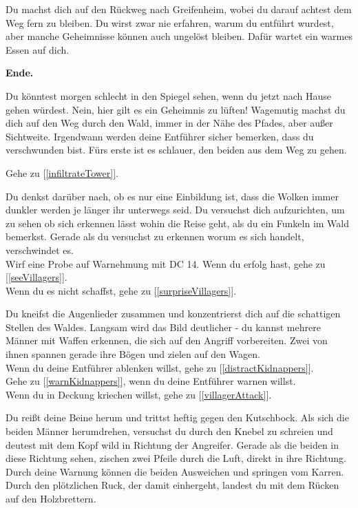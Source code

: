 
Du machst dich auf den Rückweg nach Greifenheim, wobei du darauf achtest dem Weg fern zu bleiben.
Du wirst zwar nie erfahren, warum du entführt wurdest, aber manche Geheimnisse können auch ungelöst bleiben. Dafür wartet ein warmes Essen auf dich.

\textbf{Ende.}


Du könntest morgen schlecht in den Spiegel sehen, wenn du jetzt nach Hause gehen würdest. Nein, hier gilt es ein Geheimnis zu lüften! Wagemutig machst du dich auf den Weg durch den Wald, immer in der Nähe des Pfades, aber außer Sichtweite. Irgendwann werden deine Entführer sicher bemerken, dass du verschwunden bist. Fürs erste ist es schlauer, den beiden aus dem Weg zu gehen.

Gehe zu [\ref{infiltrateTower}].


Du denkst darüber nach, ob es nur eine Einbildung ist, dass die Wolken immer dunkler werden je länger ihr unterwegs seid. Du versuchst dich aufzurichten, um zu sehen ob sich erkennen lässt wohin die Reise geht, als du ein Funkeln im Wald bemerkst. Gerade als du versuchst zu erkennen worum es sich handelt, verschwindet es.
\\Wirf eine Probe auf Warnehmung mit DC 14. Wenn du erfolg hast, gehe zu [\ref{seeVillagers}].
\\Wenn du es nicht schaffst, gehe zu [\ref{surpriseVillagers}].


Du kneifst die Augenlieder zusammen und konzentrierst dich auf die schattigen Stellen des Waldes. Langsam wird das Bild deutlicher - du kannst mehrere Männer mit Waffen erkennen, die sich auf den Angriff vorbereiten. Zwei von ihnen spannen gerade ihre Bögen und zielen auf den Wagen.
\\Wenn du deine Entführer ablenken willst, gehe zu [\ref{distractKidnappers}].
\\Gehe zu [\ref{warnKidnappers}], wenn du deine Entführer warnen willst.
\\Wenn du in Deckung kriechen willst, gehe zu [\ref{villagerAttack}].


Du reißt deine Beine herum und trittst heftig gegen den Kutschbock. Als sich die beiden Männer herumdrehen, versuchst du durch den Knebel zu schreien und deutest mit dem Kopf wild in Richtung der Angreifer. Gerade als die beiden in diese Richtung sehen, zischen zwei Pfeile durch die Luft, direkt in ihre Richtung. Durch deine Warnung können die beiden Ausweichen und springen vom Karren. Durch den plötzlichen Ruck, der damit einhergeht, landest du mit dem Rücken auf den Holzbrettern.

